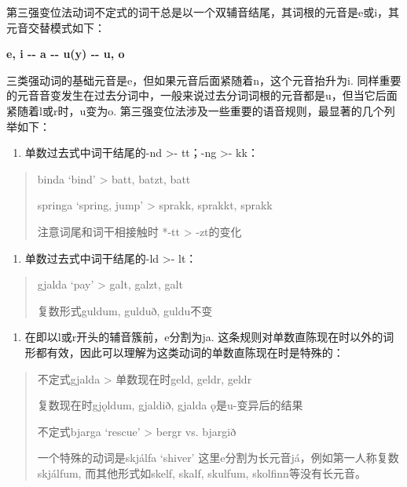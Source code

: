 第三强变位法动词不定式的词干总是以一个双辅音结尾，其词根的元音是e或i，其元音交替模式如下：

\textbf{e, i -\/- a -\/- u(y) -\/- u, o}

三类强动词的基础元音是e，但如果元音后面紧随着n，这个元音抬升为i.
同样重要的元音音变发生在过去分词中，一般来说过去分词词根的元音都是u，但当它后面紧随着l或r时，u变为o.
第三强变位法涉及一些重要的语音规则，最显著的几个列举如下：

\begin{enumerate}
  \def\labelenumi{\arabic{enumi})}
  \item
        单数过去式中词干结尾的-nd \textgreater- tt；-ng \textgreater- kk：
\end{enumerate}

\begin{quote}
  binda `bind‌' \textgreater{} batt, batzt, batt

  springa `spring, jump‌' \textgreater{} sprakk, sprakkt, sprakk

  注意词尾和词干相接触时 *-tt \textgreater{} -zt的变化
\end{quote}

\begin{enumerate}
  \def\labelenumi{\arabic{enumi})}
  \setcounter{enumi}{1}
  \item
        单数过去式中词干结尾的-ld \textgreater- lt：
\end{enumerate}

\begin{quote}
  gjalda `pay‌' \textgreater{} galt, galzt, galt

  复数形式guldum, gulduð, guldu不变
\end{quote}

\begin{enumerate}
  \def\labelenumi{\arabic{enumi})}
  \setcounter{enumi}{2}
  \item
        在即以l或r开头的辅音簇前，e分割为ja.
        这条规则对单数直陈现在时以外的词形都有效，因此可以理解为这类动词的单数直陈现在时是特殊的：
\end{enumerate}

\begin{quote}
  不定式gjalda \textgreater{} 单数现在时geld, geldr, geldr

  复数现在时gjǫldum, gjaldið, gjalda ǫ是u-变异后的结果

  不定式bjarga `rescue‌' \textgreater{} bergr vs. bjargið

  一个特殊的动词是skjálfa `shiver‌'
  这里e分割为长元音já，例如第一人称复数skjálfum, 而其他形式如skelf, skalf,
  skulfum, skolfinn等没有长元音。
\end{quote}


